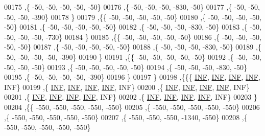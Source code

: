 \begin{DoxyCode}
00175   ,\{   -50,   -50,   -50,   -50,   -50\}
00176   ,\{   -50,   -50,   -50,  -830,   -50\}
00177   ,\{   -50,   -50,   -50,   -50,  -390\}
00178   \}
00179  ,\{\{   -50,   -50,   -50,   -50,   -50\}
00180   ,\{   -50,   -50,   -50,   -50,   -50\}
00181   ,\{   -50,   -50,   -50,   -50,   -50\}
00182   ,\{   -50,   -50,   -50,  -830,   -50\}
00183   ,\{   -50,   -50,   -50,   -50,  -730\}
00184   \}
00185  ,\{\{   -50,   -50,   -50,   -50,   -50\}
00186   ,\{   -50,   -50,   -50,   -50,   -50\}
00187   ,\{   -50,   -50,   -50,   -50,   -50\}
00188   ,\{   -50,   -50,   -50,  -830,   -50\}
00189   ,\{   -50,   -50,   -50,   -50,  -390\}
00190   \}
00191  ,\{\{   -50,   -50,   -50,   -50,   -50\}
00192   ,\{   -50,   -50,   -50,   -50,   -50\}
00193   ,\{   -50,   -50,   -50,   -50,   -50\}
00194   ,\{   -50,   -50,   -50,  -830,   -50\}
00195   ,\{   -50,   -50,   -50,   -50,  -390\}
00196   \}
00197  \}
00198 ,\{\{\{   \hyperlink{constants_8h_a12c2040f25d8e3a7b9e1c2024c618cb6}{INF},   \hyperlink{constants_8h_a12c2040f25d8e3a7b9e1c2024c618cb6}{INF},   \hyperlink{constants_8h_a12c2040f25d8e3a7b9e1c2024c618cb6}{INF},   \hyperlink{constants_8h_a12c2040f25d8e3a7b9e1c2024c618cb6}{INF},   INF\}
00199   ,\{   \hyperlink{constants_8h_a12c2040f25d8e3a7b9e1c2024c618cb6}{INF},   \hyperlink{constants_8h_a12c2040f25d8e3a7b9e1c2024c618cb6}{INF},   \hyperlink{constants_8h_a12c2040f25d8e3a7b9e1c2024c618cb6}{INF},   \hyperlink{constants_8h_a12c2040f25d8e3a7b9e1c2024c618cb6}{INF},   INF\}
00200   ,\{   \hyperlink{constants_8h_a12c2040f25d8e3a7b9e1c2024c618cb6}{INF},   \hyperlink{constants_8h_a12c2040f25d8e3a7b9e1c2024c618cb6}{INF},   \hyperlink{constants_8h_a12c2040f25d8e3a7b9e1c2024c618cb6}{INF},   \hyperlink{constants_8h_a12c2040f25d8e3a7b9e1c2024c618cb6}{INF},   INF\}
00201   ,\{   \hyperlink{constants_8h_a12c2040f25d8e3a7b9e1c2024c618cb6}{INF},   \hyperlink{constants_8h_a12c2040f25d8e3a7b9e1c2024c618cb6}{INF},   \hyperlink{constants_8h_a12c2040f25d8e3a7b9e1c2024c618cb6}{INF},   \hyperlink{constants_8h_a12c2040f25d8e3a7b9e1c2024c618cb6}{INF},   INF\}
00202   ,\{   \hyperlink{constants_8h_a12c2040f25d8e3a7b9e1c2024c618cb6}{INF},   \hyperlink{constants_8h_a12c2040f25d8e3a7b9e1c2024c618cb6}{INF},   \hyperlink{constants_8h_a12c2040f25d8e3a7b9e1c2024c618cb6}{INF},   \hyperlink{constants_8h_a12c2040f25d8e3a7b9e1c2024c618cb6}{INF},   INF\}
00203   \}
00204  ,\{\{  -550,  -550,  -550,  -550,  -550\}
00205   ,\{  -550,  -550,  -550,  -550,  -550\}
00206   ,\{  -550,  -550,  -550,  -550,  -550\}
00207   ,\{  -550,  -550,  -550, -1340,  -550\}
00208   ,\{  -550,  -550,  -550,  -550,  -550\}

\end{DoxyCode}
